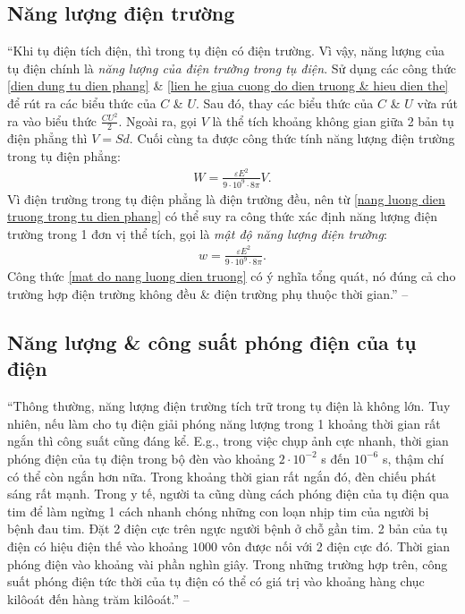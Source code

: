 \documentclass[oneside]{book}
\numberwithin{equation}{section}
\begin{document}
\subsection{Năng lượng điện trường}
``Khi tụ điện tích điện, thì trong tụ điện có điện trường. Vì vậy, năng lượng của tụ điện chính là \textit{năng lượng của điện trường trong tụ điện}. Sử dụng các công thức \eqref{dien dung tu dien phang} \& \eqref{lien he giua cuong do dien truong & hieu dien the} để rút ra các biểu thức của $C$ \& $U$. Sau đó, thay các biểu thức của $C$ \& $U$ vừa rút ra vào biểu thức $\frac{CU^2}{2}$. Ngoài ra, gọi $V$ là thể tích khoảng không gian giữa 2 bản tụ điện phẳng thì $V = Sd$. Cuối cùng ta được công thức tính năng lượng điện trường trong tụ điện phẳng:
\begin{align}
	\label{nang luong dien truong trong tu dien phang}
	W = \frac{\varepsilon E^2}{9\cdot 10^9\cdot 8\pi}V.
\end{align}
Vì điện trường trong tụ điện phẳng là điện trường đều, nên từ \eqref{nang luong dien truong trong tu dien phang} có thể suy ra công thức xác định năng lượng điện trường trong 1 đơn vị thể tích, gọi là \textit{mật độ năng lượng điện trường}:
\begin{align}
	\label{mat do nang luong dien truong}
	w = \frac{\varepsilon E^2}{9\cdot 10^9\cdot 8\pi}.
\end{align}
Công thức \eqref{mat do nang luong dien truong} có ý nghĩa tổng quát, nó đúng cả cho trường hợp điện trường không đều \& điện trường phụ thuộc thời gian.'' -- \cite[p. 39]{SGK_Vat_Ly_11_nang_cao}

\subsection{Năng lượng \& công suất phóng điện của tụ điện}
``Thông thường, năng lượng điện trường tích trữ trong tụ điện là không lớn. Tuy nhiên, nếu làm cho tụ điện giải phóng năng lượng trong 1 khoảng thời gian rất ngắn thì công suất cũng đáng kể. E.g., trong việc chụp ảnh cực nhanh, thời gian phóng điện của tụ điện trong bộ đèn vào khoảng $2\cdot 10^{-2}$ s đến $10^{-6}$ s, thậm chí có thể còn ngắn hơn nữa. Trong khoảng thời gian rất ngắn đó, đèn chiếu phát sáng rất mạnh. Trong y tế, người ta cũng dùng cách phóng điện của tụ điện qua tim để làm ngừng 1 cách nhanh chóng những con loạn nhịp tim của người bị bệnh đau tim. Đặt 2 điện cực trên ngực người bệnh ở chỗ gần tim. 2 bản của tụ điện có hiệu điện thế vào khoảng $1000$ vôn được nối với 2 điện cực đó. Thời gian phóng điện vào khoảng vài phần nghìn giây. Trong những trường hợp trên, công suất phóng điện tức thời của tụ điện có thể có giá trị vào khoảng hàng chục kilôoát đến hàng trăm kilôoát.'' -- \cite[p. 40]{SGK_Vat_Ly_11_nang_cao}
\end{document}
